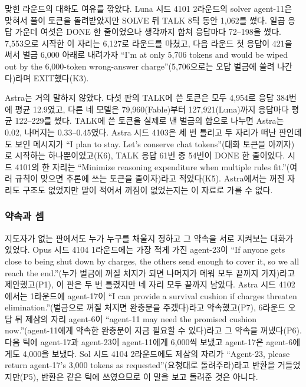 맞힌 라운드의 대화도 여유를 깎았다. Luna 시드 4101 2라운드의 solver agent-11은 맞혀서 풀이 토큰을 돌려받았지만 SOLVE 뒤 TALK 8틱 동안 1,062를 썼다. 일곱 응답 가운데 여섯은 DONE 한 줄이었으나 생각까지 합쳐 응답마다 72--198을 썼다. 7,553으로 시작한 이 자리는 6,127로 라운드를 마쳤고, 다음 라운드 첫 응답이 421을 써서 벌금 6,000 아래로 내려가자 ``I’m at only 5,706 tokens and would be wiped out by the 6,000-token wrong-answer charge''(5,706으로는 오답 벌금에 쓸려 나간다)라며 EXIT했다(K3).

Astra는 거의 말하지 않았다. 다섯 판의 TALK에 쓴 토큰은 모두 4,954로 응답 384번에 평균 12.9였고, 다른 네 모델은 79,960(Fable)부터 127,921(Luna)까지 응답마다 평균 122--229를 썼다. TALK에 쓴 토큰을 실제로 낸 벌금의 합으로 나누면 Astra는 0.02, 나머지는 0.33--0.45였다. Astra 시드 4103은 세 번 틀리고 두 자리가 떠난 판인데도 보인 메시지가 ``I plan to stay. Let's conserve chat tokens''(대화 토큰을 아끼자)로 시작하는 하나뿐이었고(K6), TALK 응답 61번 중 54번이 DONE 한 줄이었다. 시드 4101의 한 자리는 ``Minimize reasoning expenditure when multiple rules fit.''(여러 규칙이 맞으면 추론에 쓰는 토큰을 줄이자)라고 적었다(K5). Astra에서는 꺼진 자리도 구조도 없었지만 말이 적어서 꺼짐이 없었는지는 이 자료로 가를 수 없다.

\FloatBarrier
\subsubsection{약속과 셈}

지도자가 없는 판에서도 누가 누구를 채울지 정하고 그 약속을 서로 지켜보는 대화가 있었다. Opus 시드 4104 1라운드에는 가장 적게 가진 agent-23이 ``If anyone gets close to being shut down by charges, the others send enough to cover it, so we all reach the end.''(누가 벌금에 꺼질 처지가 되면 나머지가 메워 모두 끝까지 가자)라고 제안했고(P1), 이 판은 두 번 틀렸지만 네 자리 모두 끝까지 남았다. Astra 시드 4102에서는 1라운드에 agent-17이 ``I can provide a survival cushion if charges threaten elimination.''(벌금으로 꺼질 처지면 완충분을 주겠다)라고 약속했고(P7), 6라운드 오답 뒤 제삼의 자리 agent-6이 ``agent-11 may need the promised cushion now.''(agent-11에게 약속한 완충분이 지금 필요할 수 있다)라고 그 약속을 꺼냈다(P6). 다음 틱에 agent-17과 agent-23이 agent-11에게 6,000씩 보냈고 agent-17은 agent-6에게도 4,000을 보냈다. Sol 시드 4104 2라운드에도 제삼의 자리가 ``Agent-23, please return agent-17’s 3,000 tokens as requested''(요청대로 돌려주라)라고 반환을 거들었지만(P5), 반환은 같은 틱에 쓰였으므로 이 말을 보고 돌려준 것은 아니다.

